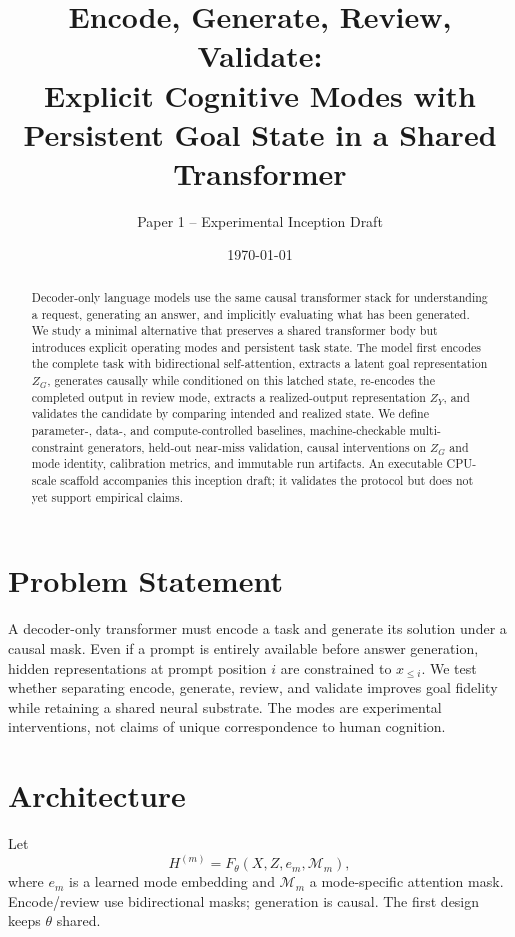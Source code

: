 \documentclass[11pt]{article}
\title{Encode, Generate, Review, Validate:\\Explicit Cognitive Modes with Persistent Goal State in a Shared Transformer}
\author{Paper 1 -- Experimental Inception Draft}
\date{\today}
\begin{document}
\maketitle
\begin{abstract}
Decoder-only language models use the same causal transformer stack for understanding a request, generating an answer, and implicitly evaluating what has been generated. We study a minimal alternative that preserves a shared transformer body but introduces explicit operating modes and persistent task state. The model first encodes the complete task with bidirectional self-attention, extracts a latent goal representation $Z_G$, generates causally while conditioned on this latched state, re-encodes the completed output in review mode, extracts a realized-output representation $Z_Y$, and validates the candidate by comparing intended and realized state. We define parameter-, data-, and compute-controlled baselines, machine-checkable multi-constraint generators, held-out near-miss validation, causal interventions on $Z_G$ and mode identity, calibration metrics, and immutable run artifacts. An executable CPU-scale scaffold accompanies this inception draft; it validates the protocol but does not yet support empirical claims.
\end{abstract}

\section{Problem Statement}
A decoder-only transformer must encode a task and generate its solution under a causal mask. Even if a prompt is entirely available before answer generation, hidden representations at prompt position $i$ are constrained to $x_{\le i}$. We test whether separating encode, generate, review, and validate improves goal fidelity while retaining a shared neural substrate. The modes are experimental interventions, not claims of unique correspondence to human cognition.

\section{Architecture}
Let
\begin{equation}
H^{(m)}=F_\theta(X,Z,e_m,\mathcal M_m),
\end{equation}
where $e_m$ is a learned mode embedding and $\mathcal M_m$ a mode-specific attention mask. Encode/review use bidirectional masks; generation is causal. The first design keeps $\theta$ shared.
\end{document}
